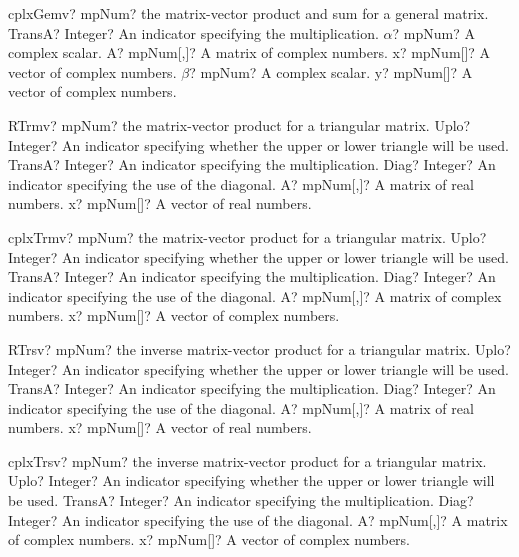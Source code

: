\documentclass[12pt,a4paper,openany]{book}
\begin{document}
\begin{mpFunctionsExtract}
\mpFunctionSix
{cplxGemv? mpNum? the matrix-vector product and sum for a general matrix.}
{TransA? Integer? An indicator specifying the multiplication.}
{$\alpha$? mpNum? A complex scalar.}
{A? mpNum[,]? A matrix of complex numbers.}
{x? mpNum[]? A vector of complex numbers.}
{$\beta$? mpNum? A complex scalar.}
{y? mpNum[]? A vector of complex numbers.}
\end{mpFunctionsExtract}

\begin{mpFunctionsExtract}
\mpFunctionFive
{RTrmv? mpNum?  the matrix-vector product for a triangular matrix.}
{Uplo? Integer? An indicator specifying whether the upper or lower triangle will be used.}
{TransA? Integer? An indicator specifying the multiplication.}
{Diag? Integer? An indicator specifying the use of the diagonal.}
{A? mpNum[,]? A matrix of real numbers.}
{x? mpNum[]? A vector of real numbers.}
\end{mpFunctionsExtract}

\begin{mpFunctionsExtract}
\mpFunctionFive
{cplxTrmv? mpNum?  the matrix-vector product for a triangular matrix.}
{Uplo? Integer? An indicator specifying whether the upper or lower triangle will be used.}
{TransA? Integer? An indicator specifying the multiplication.}
{Diag? Integer? An indicator specifying the use of the diagonal.}
{A? mpNum[,]? A matrix of complex numbers.}
{x? mpNum[]? A vector of complex numbers.}
\end{mpFunctionsExtract}

\begin{mpFunctionsExtract}
\mpFunctionFive
{RTrsv? mpNum?  the inverse matrix-vector product for a triangular matrix.}
{Uplo? Integer? An indicator specifying whether the upper or lower triangle will be used.}
{TransA? Integer? An indicator specifying the multiplication.}
{Diag? Integer? An indicator specifying the use of the diagonal.}
{A? mpNum[,]? A matrix of real numbers.}
{x? mpNum[]? A vector of real numbers.}
\end{mpFunctionsExtract}

\begin{mpFunctionsExtract}
\mpFunctionFive
{cplxTrsv? mpNum?  the inverse matrix-vector product for a triangular matrix.}
{Uplo? Integer? An indicator specifying whether the upper or lower triangle will be used.}
{TransA? Integer? An indicator specifying the multiplication.}
{Diag? Integer? An indicator specifying the use of the diagonal.}
{A? mpNum[,]? A matrix of complex numbers.}
{x? mpNum[]? A vector of complex numbers.}
\end{mpFunctionsExtract}
\end{document}
